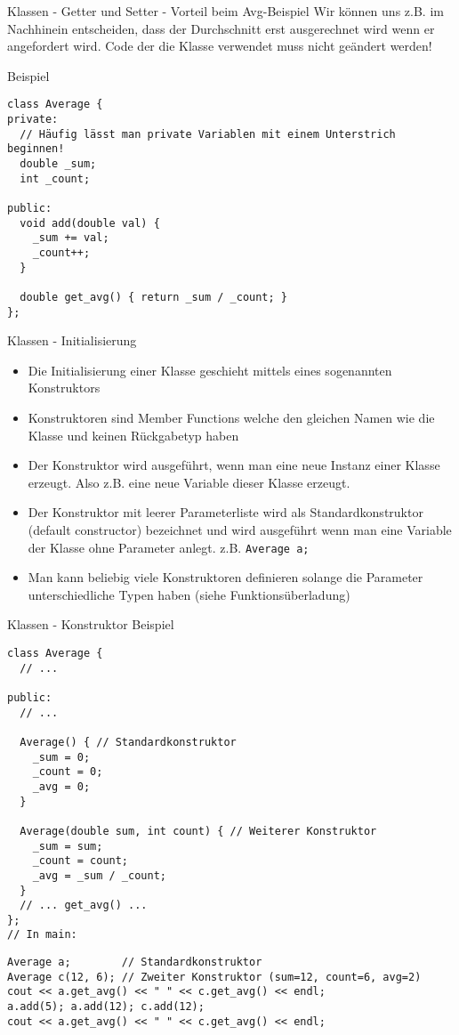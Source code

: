 \documentclass[presentation]{beamer}
\begin{document}
\begin{frame}[label={sec:orgac2958d},fragile]{Klassen - Getter und Setter - Vorteil beim Avg-Beispiel}
 Wir können uns z.B. im \alert{Nachhinein entscheiden}, dass der Durchschnitt
erst ausgerechnet wird wenn er angefordert wird. \alert{Code der die Klasse
verwendet muss nicht geändert werden!}
\begin{exampleblock}{Beispiel}
\begin{verbatim}
class Average {
private:
  // Häufig lässt man private Variablen mit einem Unterstrich beginnen!
  double _sum;
  int _count;

public:
  void add(double val) {
    _sum += val;
    _count++;
  }

  double get_avg() { return _sum / _count; }
};
\end{verbatim}
\end{exampleblock}
\end{frame}
\begin{frame}[label={sec:org345c966},fragile]{Klassen - Initialisierung}
 \begin{itemize}
\item Die Initialisierung einer Klasse geschieht mittels eines sogenannten
\alert{Konstruktors}
\item Konstruktoren sind Member Functions welche den \alert{gleichen Namen wie
die Klasse} und \alert{keinen Rückgabetyp} haben
\item Der Konstruktor wird ausgeführt, wenn man eine neue Instanz einer
Klasse erzeugt. Also z.B. eine neue Variable dieser Klasse erzeugt.
\item Der Konstruktor mit \alert{leerer Parameterliste} wird als
\alert{Standardkonstruktor} (default constructor) bezeichnet und wird
ausgeführt wenn man eine Variable der Klasse ohne Parameter anlegt.
z.B. {\color{solarizedYellow}\verb!Average a;!}
\item Man kann \alert{beliebig viele Konstruktoren} definieren solange die
Parameter unterschiedliche Typen haben (siehe \alert{Funktionsüberladung})
\end{itemize}
\end{frame}
\begin{frame}[label={sec:org7c30d31},fragile]{Klassen - Konstruktor Beispiel}
 \begin{verbatim}
class Average {
  // ...

public:
  // ...

  Average() { // Standardkonstruktor
    _sum = 0;
    _count = 0;
    _avg = 0;
  }

  Average(double sum, int count) { // Weiterer Konstruktor
    _sum = sum;
    _count = count;
    _avg = _sum / _count;
  }
  // ... get_avg() ...
};
// In main:
\end{verbatim}
\begin{verbatim}
Average a;        // Standardkonstruktor
Average c(12, 6); // Zweiter Konstruktor (sum=12, count=6, avg=2)
cout << a.get_avg() << " " << c.get_avg() << endl;
a.add(5); a.add(12); c.add(12); 
cout << a.get_avg() << " " << c.get_avg() << endl;
\end{verbatim}
\end{frame}
\end{document}
